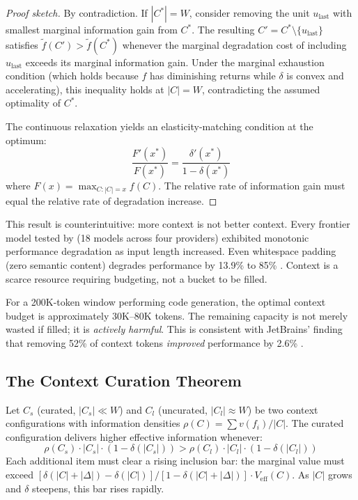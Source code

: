 \begin{proof}[Proof sketch]
By contradiction. If $|C^*| = W$, consider removing the unit $u_{\text{last}}$ with smallest marginal information gain from $C^*$. The resulting $C' = C^* \setminus \{u_{\text{last}}\}$ satisfies $\tilde{f}(C') > \tilde{f}(C^*)$ whenever the marginal degradation cost of including $u_{\text{last}}$ exceeds its marginal information gain. Under the marginal exhaustion condition (which holds because $f$ has diminishing returns while $\delta$ is convex and accelerating), this inequality holds at $|C| = W$, contradicting the assumed optimality of $C^*$.

The continuous relaxation yields an elasticity-matching condition at the optimum:
\[
    \frac{F'(x^*)}{F(x^*)} = \frac{\delta'(x^*)}{1 - \delta(x^*)}
\]
where $F(x) = \max_{C:|C|=x} f(C)$. The relative rate of information gain must equal the relative rate of degradation increase.
\end{proof}

This result is counterintuitive: more context is not better context. Every frontier model tested by \citet{chroma2025contextrot} (18 models across four providers) exhibited monotonic performance degradation as input length increased. Even whitespace padding (zero semantic content) degrades performance by 13.9\% to 85\% \citep{du2025context}. Context is a scarce resource requiring budgeting, not a bucket to be filled.

For a 200K-token window performing code generation, the optimal context budget is approximately 30K--80K tokens. The remaining capacity is not merely wasted if filled; it is \emph{actively harmful}. This is consistent with JetBrains' finding that removing 52\% of context tokens \emph{improved} performance by 2.6\% \citep{jetbrains2025complexity}.

\subsection{The Context Curation Theorem}

\begin{theorem}
\label{thm:curation}
Let $C_s$ (curated, $|C_s| \ll W$) and $C_l$ (uncurated, $|C_l| \approx W$) be two context configurations with information densities $\rho(C) = \sum v(f_i) / |C|$. The curated configuration delivers higher effective information whenever:
\begin{equation}
    \rho(C_s) \cdot |C_s| \cdot (1 - \delta(|C_s|)) > \rho(C_l) \cdot |C_l| \cdot (1 - \delta(|C_l|))
\end{equation}
Each additional item must clear a rising inclusion bar: the marginal value must exceed $[\delta(|C| + |\Delta|) - \delta(|C|)] / [1 - \delta(|C| + |\Delta|)] \cdot V_{\text{eff}}(C)$. As $|C|$ grows and $\delta$ steepens, this bar rises rapidly.
\end{theorem}

